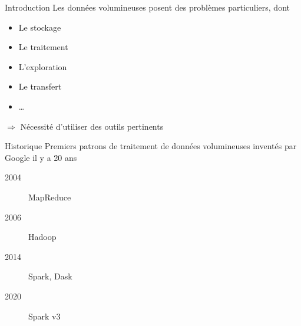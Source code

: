 \begin{frame}{Introduction}
  Les données volumineuses posent des problèmes particuliers, dont

  \begin{itemize}
    \item Le stockage
    \item Le traitement
    \item L'exploration
    \item Le transfert
    \item …
  \end{itemize}

  $\Rightarrow$ Nécessité d'utiliser des outils pertinents
\end{frame}

\begin{frame}{Historique}
  Premiers patrons de traitement de données volumineuses inventés par Google il y a 20 ans

  \begin{description}
    \item[2004] MapReduce
    \item[2006] Hadoop
    \item[2014] Spark, Dask
    \item[2020] Spark v3
  \end{description}
\end{frame}
